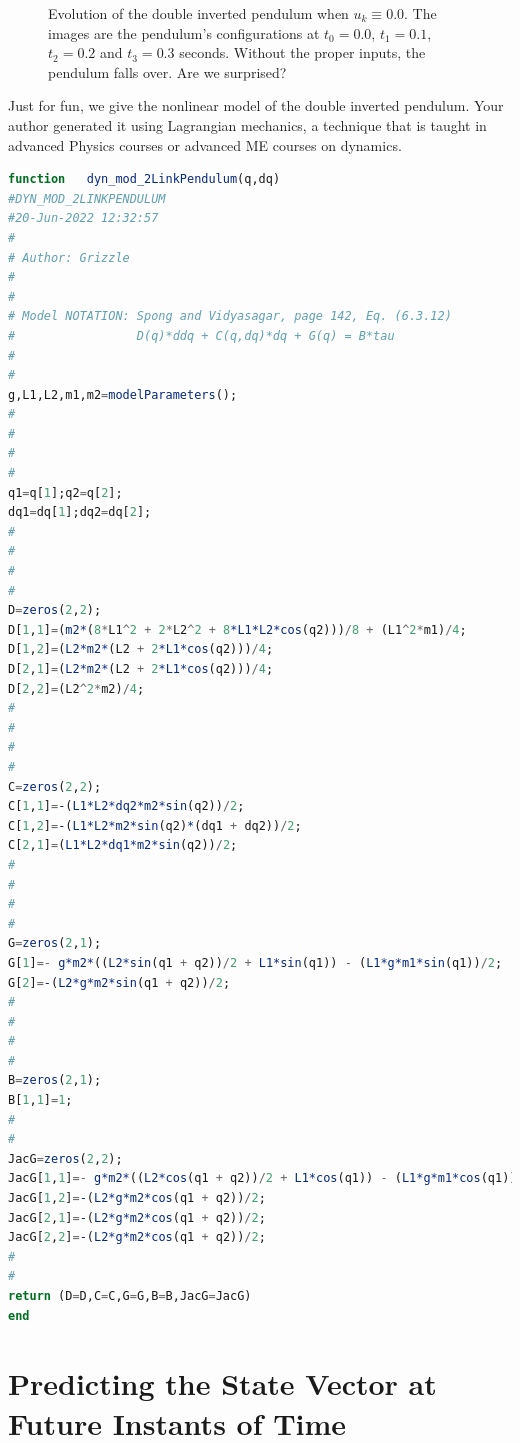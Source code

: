 \begin{figure}[htb!]
{	\centering
		\setlength{\fboxsep}{0pt}%
\setlength{\fboxrule}{3pt}%
}

\caption[]{Evolution of the double inverted pendulum when $u_k \equiv 0.0$. The images are the pendulum's configurations at $t_0=0.0$, $t_1=0.1$, $t_2=0.2$ and $t_3=0.3$ seconds. Without the proper inputs, the pendulum falls over. Are we surprised?}
    \label{fig:SnapShotFallingPendulum}
\end{figure}

Just for fun, we give the nonlinear model of the double inverted pendulum. Your author generated it using Lagrangian mechanics, a technique that is taught in advanced Physics courses or advanced ME courses on dynamics. 

\begin{lstlisting}[language=Julia,style=mystyle]
function   dyn_mod_2LinkPendulum(q,dq)
#DYN_MOD_2LINKPENDULUM
#20-Jun-2022 12:32:57
#
# Author: Grizzle
#
#
# Model NOTATION: Spong and Vidyasagar, page 142, Eq. (6.3.12)
#                 D(q)*ddq + C(q,dq)*dq + G(q) = B*tau 
#
#
g,L1,L2,m1,m2=modelParameters();
#
#
#
#
q1=q[1];q2=q[2];
dq1=dq[1];dq2=dq[2];
#
#
#
#
D=zeros(2,2);
D[1,1]=(m2*(8*L1^2 + 2*L2^2 + 8*L1*L2*cos(q2)))/8 + (L1^2*m1)/4;
D[1,2]=(L2*m2*(L2 + 2*L1*cos(q2)))/4;
D[2,1]=(L2*m2*(L2 + 2*L1*cos(q2)))/4;
D[2,2]=(L2^2*m2)/4;
#
#
#
#
C=zeros(2,2);
C[1,1]=-(L1*L2*dq2*m2*sin(q2))/2;
C[1,2]=-(L1*L2*m2*sin(q2)*(dq1 + dq2))/2;
C[2,1]=(L1*L2*dq1*m2*sin(q2))/2;
#
#
#
#
G=zeros(2,1);
G[1]=- g*m2*((L2*sin(q1 + q2))/2 + L1*sin(q1)) - (L1*g*m1*sin(q1))/2;
G[2]=-(L2*g*m2*sin(q1 + q2))/2;
#
#
#
#
B=zeros(2,1);
B[1,1]=1;
#
#
JacG=zeros(2,2);
JacG[1,1]=- g*m2*((L2*cos(q1 + q2))/2 + L1*cos(q1)) - (L1*g*m1*cos(q1))/2;
JacG[1,2]=-(L2*g*m2*cos(q1 + q2))/2;
JacG[2,1]=-(L2*g*m2*cos(q1 + q2))/2;
JacG[2,2]=-(L2*g*m2*cos(q1 + q2))/2;
#
#
return (D=D,C=C,G=G,B=B,JacG=JacG)
end
\end{lstlisting}

\section{Predicting the State Vector at Future Instants of Time}

